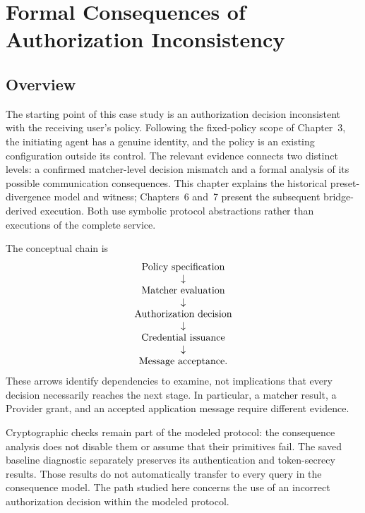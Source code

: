 \section{Formal Consequences of Authorization Inconsistency}
\label{sec:attack-path}

\subsection{Overview}

The starting point of this case study is an authorization decision inconsistent
with the receiving user's policy. Following the fixed-policy scope of
Chapter~3, the initiating agent has a genuine identity, and the policy is an
existing configuration outside its control. The relevant evidence connects
two distinct levels: a confirmed matcher-level decision mismatch and a formal
analysis of its possible communication consequences. This chapter explains
the historical preset-divergence model and witness; Chapters~6 and~7 present
the subsequent bridge-derived execution. Both use symbolic protocol
abstractions rather than executions of the complete service.

The conceptual chain is
\[
\begin{array}{c}
\textnormal{Policy specification} \\
\downarrow \\
\textnormal{Matcher evaluation} \\
\downarrow \\
\textnormal{Authorization decision} \\
\downarrow \\
\textnormal{Credential issuance} \\
\downarrow \\
\textnormal{Message acceptance}.
\end{array}
\]
These arrows identify dependencies to examine, not implications that every
decision necessarily reaches the next stage. In particular, a matcher result,
a Provider grant, and an accepted application message require different
evidence.

Cryptographic checks remain part of the modeled protocol: the consequence
analysis does not disable them or assume that their primitives fail. The
saved baseline diagnostic separately preserves its authentication and
token-secrecy results. Those results do not automatically transfer to every
query in the consequence model. The path studied here concerns the use of an
incorrect authorization decision within the modeled protocol.

